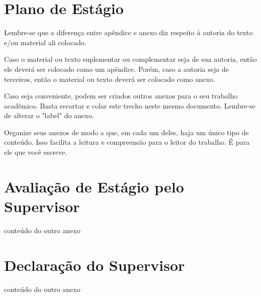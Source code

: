 
\begin{anexosenv}
\partanexos

\chapter{Plano de Estágio}     %
\label{chap:planoDeEstagio}

Lembre-se que a diferença entre apêndice e anexo diz respeito à autoria do texto e/ou material ali colocado.

Caso o material ou texto suplementar ou complementar seja de sua autoria, então ele deverá ser colocado como um apêndice. Porém, caso a autoria seja de terceiros, então o material ou texto deverá ser colocado como anexo.

Caso seja conveniente, podem ser criados outros anexos para o seu trabalho acadêmico. Basta recortar e colar este trecho neste mesmo documento. Lembre-se de alterar o "label"{} do anexo.

Organize seus anexos de modo a que, em cada um deles, haja um único tipo de conteúdo. Isso facilita a leitura e compreensão para o leitor do trabalho. É para ele que você escreve.

\chapter{Avaliação de Estágio pelo Supervisor}
\label{chap:AvaliacaoDeEstagioPeloSupervisor}

conteúdo do outro anexo


\chapter{Declaração do Supervisor}
\label{chap:DeclaracaoDoSupervisor}

conteúdo do outro anexo

\end{anexosenv}
